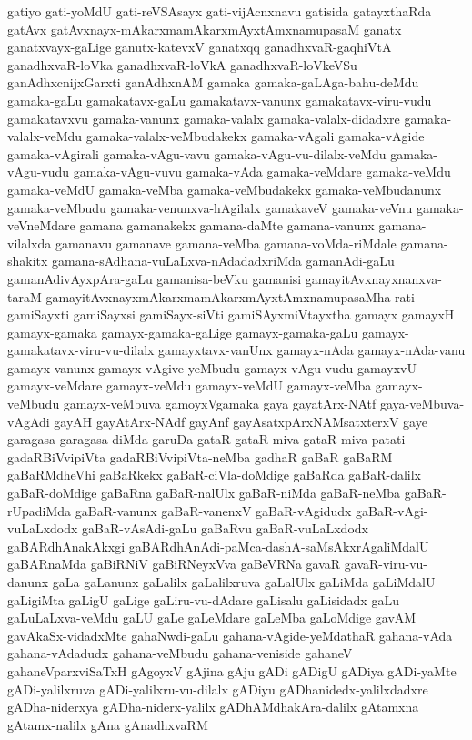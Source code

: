 {gatiyo
gati-yoMdU
gati-reVSAsayx
gati-vijAcnxnavu
gatisida
gatayxthaRda
gatAvx
gatAvxnayx-mAkarxmamAkarxmAyxtAmxnamupasaM
ganatx
ganatxvayx-gaLige
ganutx-katevxV
ganatxqq
ganadhxvaR-gaqhiVtA
ganadhxvaR-loVka
ganadhxvaR-loVkA
ganadhxvaR-loVkeVSu
ganAdhxcnijxGarxti
ganAdhxnAM
gamaka
gamaka-gaLAga-bahu-deMdu
gamaka-gaLu
gamakatavx-gaLu
gamakatavx-vanunx
gamakatavx-viru-vudu
gamakatavxvu
gamaka-vanunx
gamaka-valalx
gamaka-valalx-didadxre
gamaka-valalx-veMdu
gamaka-valalx-veMbudakekx
gamaka-vAgali
gamaka-vAgide
gamaka-vAgirali
gamaka-vAgu-vavu
gamaka-vAgu-vu-dilalx-veMdu
gamaka-vAgu-vudu
gamaka-vAgu-vuvu
gamaka-vAda
gamaka-veMdare
gamaka-veMdu
gamaka-veMdU
gamaka-veMba
gamaka-veMbudakekx
gamaka-veMbudanunx
gamaka-veMbudu
gamaka-venunxva-hAgilalx
gamakaveV
gamaka-veVnu
gamaka-veVneMdare
gamana
gamanakekx
gamana-daMte
gamana-vanunx
gamana-vilalxda
gamanavu
gamanave
gamana-veMba
gamana-voMda-riMdale
gamana-shakitx
gamana-sAdhana-vuLaLxva-nAdadadxriMda
gamanAdi-gaLu
gamanAdivAyxpAra-gaLu
gamanisa-beVku
gamanisi
gamayitAvxnayxnanxva-taraM
gamayitAvxnayxmAkarxmamAkarxmAyxtAmxnamupasaMha-rati
gamiSayxti
gamiSayxsi
gamiSayx-siVti
gamiSAyxmiVtayxtha
gamayx
gamayxH
gamayx-gamaka
gamayx-gamaka-gaLige
gamayx-gamaka-gaLu
gamayx-gamakatavx-viru-vu-dilalx
gamayxtavx-vanUnx
gamayx-nAda
gamayx-nAda-vanu
gamayx-vanunx
gamayx-vAgive-yeMbudu
gamayx-vAgu-vudu
gamayxvU
gamayx-veMdare
gamayx-veMdu
gamayx-veMdU
gamayx-veMba
gamayx-veMbudu
gamayx-veMbuva
gamoyxVgamaka
gaya
gayatArx-NAtf
gaya-veMbuva-vAgAdi
gayAH
gayAtArx-NAdf
gayAnf
gayAsatxpArxNAMsatxterxV
gaye
garagasa
garagasa-diMda
garuDa
gataR
gataR-miva
gataR-miva-patati
gadaRBiVvipiVta
gadaRBiVvipiVta-neMba
gadhaR
gaBaR
gaBaRM
gaBaRMdheVhi
gaBaRkekx
gaBaR-ciVla-doMdige
gaBaRda
gaBaR-dalilx
gaBaR-doMdige
gaBaRna
gaBaR-nalUlx
gaBaR-niMda
gaBaR-neMba
gaBaR-rUpadiMda
gaBaR-vanunx
gaBaR-vanenxV
gaBaR-vAgidudx
gaBaR-vAgi-vuLaLxdodx
gaBaR-vAsAdi-gaLu
gaBaRvu
gaBaR-vuLaLxdodx
gaBARdhAnakAkxgi
gaBARdhAnAdi-paMca-dashA-saMsAkxrAgaliMdalU
gaBARnaMda
gaBiRNiV
gaBiRNeyxVva
gaBeVRNa
gavaR
gavaR-viru-vu-danunx
gaLa
gaLanunx
gaLalilx
gaLalilxruva
gaLalUlx
gaLiMda
gaLiMdalU
gaLigiMta
gaLigU
gaLige
gaLiru-vu-dAdare
gaLisalu
gaLisidadx
gaLu
gaLuLaLxva-veMdu
gaLU
gaLe
gaLeMdare
gaLeMba
gaLoMdige
gavAM
gavAkaSx-vidadxMte
gahaNwdi-gaLu
gahana-vAgide-yeMdathaR
gahana-vAda
gahana-vAdadudx
gahana-veMbudu
gahana-veniside
gahaneV
gahaneVparxviSaTxH
gAgoyxV
gAjina
gAju
gADi
gADigU
gADiya
gADi-yaMte
gADi-yalilxruva
gADi-yalilxru-vu-dilalx
gADiyu
gADhanidedx-yalilxdadxre
gADha-niderxya
gADha-niderx-yalilx
gADhAMdhakAra-dalilx
gAtamxna
gAtamx-nalilx
gAna
gAnadhxvaRM
}
